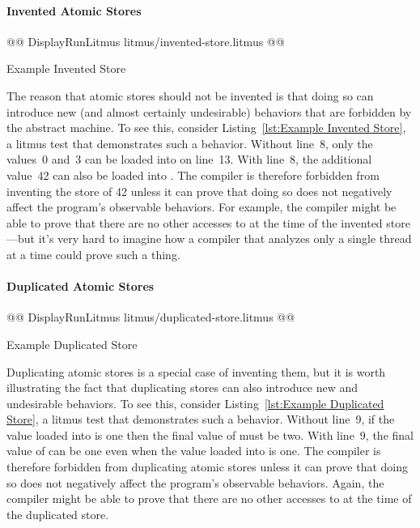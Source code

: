 \documentclass[10]{article}
\begin{document}
\paragraph{Invented Atomic Stores}
\begin{listing}[tbp]
@@ DisplayRunLitmus litmus/invented-store.litmus @@
\caption{Example Invented Store}
\label{lst:Example Invented Store}
\end{listing}
The reason that atomic stores should not be invented is that doing so can
introduce new (and almost certainly undesirable) behaviors that are
forbidden by the abstract machine.
To see this, consider Listing~\ref{lst:Example Invented Store},
a  litmus test that demonstrates such a behavior.
Without line~8, only the values~0 and~3 can be loaded into  on
line~13.
With line~8, the additional value~42 can also be loaded into .
The compiler is therefore forbidden from inventing the store of 42
unless it can prove that doing so does not negatively affect the
program's observable behaviors.
For example, the compiler might be able to prove that there
are no other accesses to  at the time of the invented
store---but it's very hard to imagine how a compiler that analyzes
only a single thread at a time could prove such a thing.

\paragraph{Duplicated Atomic Stores}
\begin{listing}[tbp]
@@ DisplayRunLitmus litmus/duplicated-store.litmus @@
\caption{Example Duplicated Store}
\label{lst:Example Duplicated Store}
\end{listing}
Duplicating atomic stores is a special case of inventing them, but it is
worth illustrating the fact that duplicating stores can also introduce
new and undesirable behaviors.
To see this, consider Listing~\ref{lst:Example Duplicated Store}, a
litmus test that demonstrates such a behavior.
Without line~9, if the value loaded into  is one then the final value
of  must be two.
With line~9, the final value of  can be one even when the
value loaded into  is one.
The compiler is therefore forbidden from duplicating atomic stores
unless it can prove that doing so does not negatively affect the
program's observable behaviors.
Again, the compiler might be able to prove that there
are no other accesses to  at the time of the duplicated store.
\end{document}
